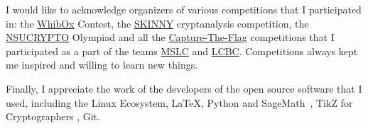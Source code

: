\begin{acknowledgements}
I would like to acknowledge organizers of various competitions that I participated in: the \href{http://whibox.cr.yp.to/}{WhibOx} Contest, the \href{https://sites.google.com/site/skinnycipher/cryptanalysis-competition/2018-2019-competition}{SKINNY} cryptanalysis competition, the \href{https://nsucrypto.nsu.ru/}{NSUCRYPTO} Olympiad and all the \href{https://ctftime.org}{Capture-The-Flag} competitions that I participated as a part of the teams \href{https://ctftime.org/team/1005}{MSLC} and \href{https://ctftime.org/team/15726}{LC{\Lightning}BC}. Competitions always kept me inspired and willing to learn new things.

Finally, I appreciate the work of the developers of the open source software that I used, including the Linux Ecosystem, \LaTeX, Python and SageMath~\cite{sage}, TikZ for Cryptographers \cite{TikZ}, Git.
\end{acknowledgements}